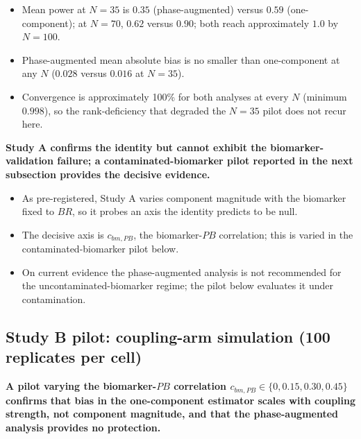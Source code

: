 \documentclass[
  11pt,
]{article}
\begin{document}
\begin{itemize}\setlength{\itemsep}{2pt}\setlength{\parskip}{0pt}
\item Mean power at $N=35$ is $0.35$ (phase-augmented) versus $0.59$ (one-component); at $N=70$, $0.62$ versus $0.90$; both reach approximately $1.0$ by $N=100$.
\item Phase-augmented mean absolute bias is no smaller than one-component at any $N$ ($0.028$ versus $0.016$ at $N=35$).
\item Convergence is approximately 100\% for both analyses at every $N$ (minimum $0.998$), so the rank-deficiency that degraded the $N=35$ pilot does not recur here.
\end{itemize}

\textbf{Study A confirms the identity but cannot exhibit the biomarker-validation failure; a contaminated-biomarker pilot reported in the next subsection provides the decisive evidence.}

\begin{itemize}\setlength{\itemsep}{2pt}\setlength{\parskip}{0pt}
\item As pre-registered, Study A varies component magnitude with the biomarker fixed to $BR$, so it probes an axis the identity predicts to be null.
\item The decisive axis is $c_{bm,PB}$, the biomarker-$PB$ correlation; this is varied in the contaminated-biomarker pilot below.
\item On current evidence the phase-augmented analysis is not recommended for the uncontaminated-biomarker regime; the pilot below evaluates it under contamination.
\end{itemize}

\subsection{Study B pilot: coupling-arm simulation (100 replicates per cell)}\label{study-b-pilot-coupling-arm-simulation-100-replicates-per-cell}

\textbf{A pilot varying the biomarker-$PB$ correlation $c_{bm,PB}
\in \{0, 0.15, 0.30, 0.45\}$ confirms that bias in the
one-component estimator scales with coupling strength, not
component magnitude, and that the phase-augmented analysis
provides no protection.}
\end{document}
